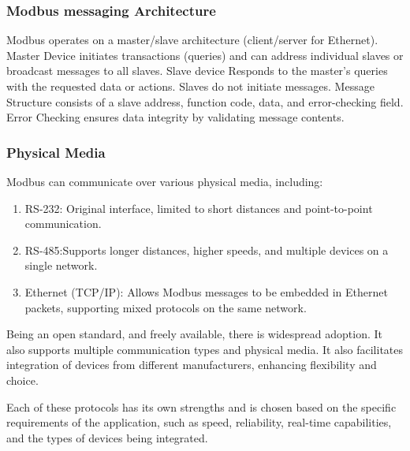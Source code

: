 \begin{enumerate}
\subsubsection{ Modbus messaging Architecture}
Modbus operates on a master/slave architecture (client/server for Ethernet). Master Device initiates transactions (queries) and can address individual slaves or broadcast messages to all slaves. Slave device Responds to the master's queries with the requested data or actions. Slaves do not initiate messages. Message Structure consists of a slave address, function code, data, and error-checking field. Error Checking ensures data integrity by validating message contents.

\subsubsection{Physical Media}
Modbus can communicate over various physical media, including:
\begin{enumerate}
    \item RS-232: Original interface, limited to short distances and point-to-point communication.
    \item RS-485:Supports longer distances, higher speeds, and multiple devices on a single network.
    \item Ethernet (TCP/IP): Allows Modbus messages to be embedded in Ethernet packets, supporting mixed protocols on the same network.
\end{enumerate}


Being an open standard, and freely available, there is widespread adoption. It also supports multiple communication types and physical media. It also facilitates integration of devices from different manufacturers, enhancing flexibility and choice.
    
\end{enumerate}

Each of these protocols has its own strengths and is chosen based on the specific requirements of the application, such as speed, reliability, real-time capabilities, and the types of devices being integrated.


